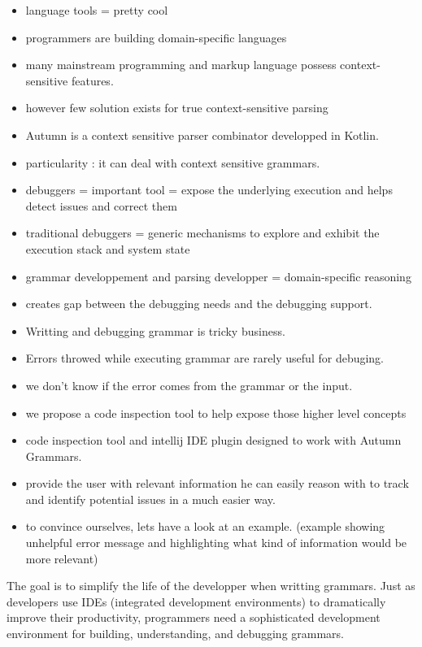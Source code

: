 	\begin{itemize}
		\item language tools = pretty cool
		\item programmers are building domain-specific languages
		\item many mainstream programming and markup language possess context-sensitive features. 
		\item however few solution exists for true context-sensitive parsing
		\item Autumn is a context sensitive parser combinator developped in Kotlin.
		\item particularity : it can deal with context sensitive grammars.
		\item debuggers = important tool = expose the underlying execution and helps detect issues and correct them
		\item traditional debuggers =  generic mechanisms to explore and exhibit the execution stack and system state
		\item grammar developpement and parsing developper = domain-specific reasoning
		\item creates gap between the debugging needs and the debugging support.
		\item Writting and debugging grammar is tricky business. 
		\item Errors throwed while executing grammar are rarely useful for debuging.
		\item we don't know if the error comes from the grammar or the input.
		\item we propose a code inspection tool to help expose those higher level concepts 
		\item code inspection tool and intellij IDE plugin designed to work with Autumn Grammars.
		\item provide the user with relevant information he can easily reason with to track and identify potential issues in a much easier way.
		\item to convince ourselves, lets have a look at an example. (example showing unhelpful error message and highlighting what kind of information would be more relevant)
	\end{itemize}

		The goal is to simplify the life of the developper when writting grammars.
	Just as developers use IDEs (integrated development environments) to dramatically improve their productivity, programmers need a sophisticated development environment for building, understanding, and debugging grammars. 

